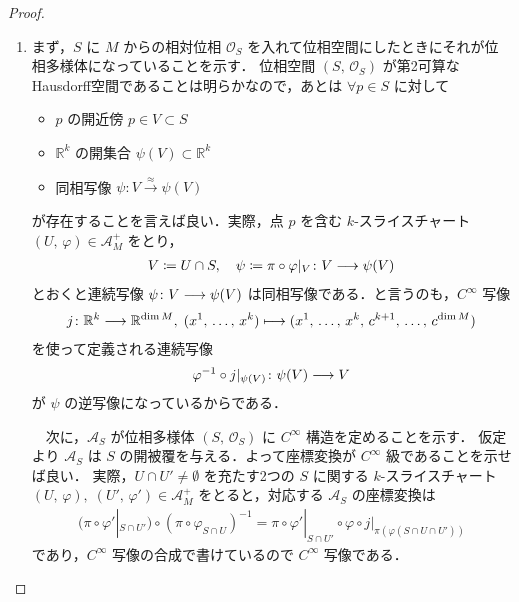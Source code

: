 \documentclass[geometry_main]{subfiles}
\begin{document}
\begin{proof}
\begin{enumerate}
		\item 
		まず，$S$ に $M$ からの相対位相 $\mathcal{O}_S$ を入れて位相空間にしたときにそれが位相多様体になっていることを示す．
		位相空間 $(S,\, \mathcal{O}_S)$ が第2可算なHausdorff空間であることは明らかなので，あとは $\forall p \in S$ に対して
		\begin{itemize}
			\item $p$ の開近傍 $p \in V \subset S$
			\item $\mathbb{R}^{k}$ の開集合 $\psi(V) \subset \mathbb{R}^{k}$
			\item 同相写像 $\psi \colon V \xrightarrow{\approx} \psi(V)$
		\end{itemize}
		が存在することを言えば良い．実際，点 $p$ を含む $k$-スライスチャート $(U,\, \varphi) \in \mathcal{A}_M^+$ をとり，
		\begin{align}
			V \coloneqq U \cap S,\quad \psi \coloneqq \pi \circ \varphi|_V \colon V \longrightarrow \psi(V)
		\end{align}
		とおくと連続写像 $\psi \colon V \longrightarrow \psi(V)$ は同相写像である．と言うのも，$C^\infty$ 写像
		\begin{align}
			j \colon \mathbb{R}^k \longrightarrow \mathbb{R}^{\dim M},\; (x^1,\, \dots,\, x^k) \longmapsto (x^1,\, \dots,\, x^k,\, c^{k+1},\, \dots,\, c^{\dim M})
		\end{align}
		を使って定義される連続写像
		\begin{align}
			\varphi^{-1} \circ j|_{\psi(V)} \colon \psi(V) \longrightarrow V
		\end{align}
		が $\psi$ の逆写像になっているからである．

		　次に，$\mathcal{A}_S$ が位相多様体 $(S,\, \mathcal{O}_S)$ に $C^\infty$ 構造を定めることを示す．
		仮定より $\mathcal{A}_S$ は $S$ の開被覆を与える．よって座標変換が $C^\infty$ 級であることを示せば良い． 
		実際，$U \cap U' \neq \emptyset$ を充たす2つの $S$ に関する $k$-スライスチャート $(U,\, \varphi),\; (U',\, \varphi') \in \mathcal{A}_M^+$ をとると，対応する
		$\mathcal{A}_S$ の座標変換は
		\begin{align}
			(\pi \circ \varphi'|_{S \cap U'}) \circ (\pi \circ \varphi_{S \cap U})^{-1} = \pi \circ \varphi'|_{S \cap U'} \circ \varphi \circ j|_{\pi (\varphi(S \cap U \cap U'))}
		\end{align}
		であり，$C^\infty$ 写像の合成で書けているので $C^\infty$ 写像である．


\end{enumerate}
\end{proof}
\end{document}

